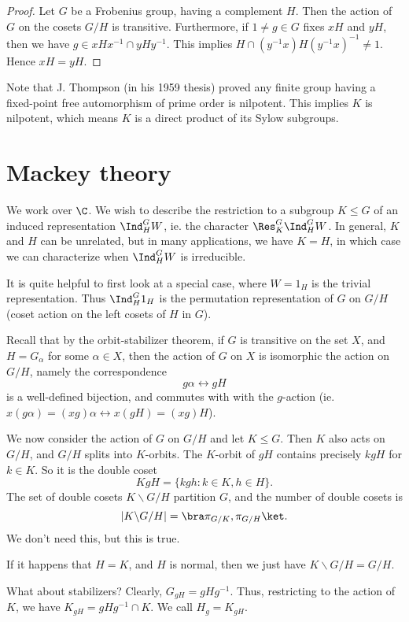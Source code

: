 \documentclass[a4paper]{article}
\begin{document}
\begin{proof}
  Let $G$ be a Frobenius group, having a complement $H$. Then the action of $G$ on the cosets $G/H$ is transitive. Furthermore, if $1 \not= g\in G$ fixes $xH$ and $yH$, then we have $g \in xHx^{-1} \cap yHy^{-1}$. This implies $H \cap (y^{-1}x) H (y^{-1}x)^{-1} \not= 1$. Hence $xH = yH$.
\end{proof}

Note that J. Thompson (in his 1959 thesis) proved any finite group having a fixed-point free automorphism of prime order is nilpotent. This implies $K$ is nilpotent, which means $K$ is a direct product of its Sylow subgroups.

\section{Mackey theory}
We work over $\C$. We wish to describe the restriction to a subgroup $K\leq G$ of an induced representation $\Ind_H^G W$, ie. the character $\Res_K^G \Ind_H^G W$. In general, $K$ and $H$ can be unrelated, but in many applications, we have $K = H$, in which case we can characterize when $\Ind_H^G W$ is irreducible.

It is quite helpful to first look at a special case, where $W = 1_H$ is the trivial representation. Thus $\Ind_H^G 1_H$ is the permutation representation of $G$ on $G/H$ (coset action on the left cosets of $H$ in $G$).

Recall that by the orbit-stabilizer theorem, if $G$ is transitive on the set $X$, and $H = G_\alpha$ for some $\alpha \in X$, then the action of $G$ on $X$ is isomorphic the action on $G/H$, namely the correspondence
\[
  g\alpha \leftrightarrow gH
\]
is a well-defined bijection, and commutes with with the $g$-action (ie. $x (g\alpha) = (xg)\alpha \leftrightarrow x(gH) = (xg)H$).

We now consider the action of $G$ on $G/H$ and let $K \leq G$. Then $K$ also acts on $G/H$, and $G/H$ splits into $K$-orbits. The $K$-orbit of $gH$ contains precisely $kgH$ for $k \in K$. So it is the double coset
\[
  KgH = \{kgh: k \in K, h \in H\}.
\]
The set of double cosets $K \backslash G/H$ partition $G$, and the number of double cosets is
\[
  |K \backslash G/H| = \bra \pi_{G/K}, \pi_{G/H}\ket.
\]
We don't need this, but this is true.

If it happens that $H = K$, and $H$ is normal, then we just have $K\backslash G/H = G/H$.

What about stabilizers? Clearly, $G_{gH} = gHg^{-1}$. Thus, restricting to the action of $K$, we have $K_{gH} = gHg^{-1} \cap K$. We call $H_g =K_{gH}$.
\end{document}

